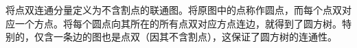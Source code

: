 将点双连通分量定义为不含割点的联通图。将原图中的点称作圆点，而每个点双对应一个方点。将每个圆点向其所在的所有点双对应方点连边，就得到了圆方树。特别的，仅含一条边的图也是点双（因其不含割点），这保证了圆方树的连通性。
\inputminted{cpp}{src/graph/tarjan-tree.cpp}